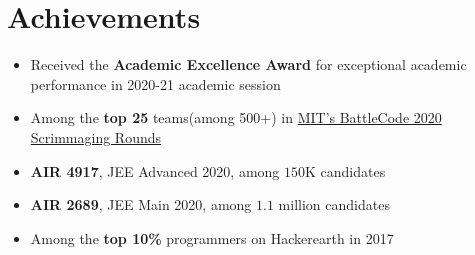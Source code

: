 \section*{\sc Achievements}
\vspace{-2mm}
\hrulefill
\vspace{1mm}

\begin{itemize}
    \item Received the \textbf{Academic Excellence Award} for exceptional academic performance in 2020-21 academic session
    \item Among the \textbf{top 25} teams(among 500+) in  \href{https://github.com/abhishekshree/BattleCode}{MIT's BattleCode 2020 Scrimmaging Rounds}
    \item \textbf{AIR 4917}, JEE Advanced 2020, among $150$K candidates 
    \item \textbf{AIR 2689}, JEE Main 2020, among $1.1$ million candidates
    \item Among the \textbf{top 10\%} programmers on Hackerearth in 2017
\end{itemize}
